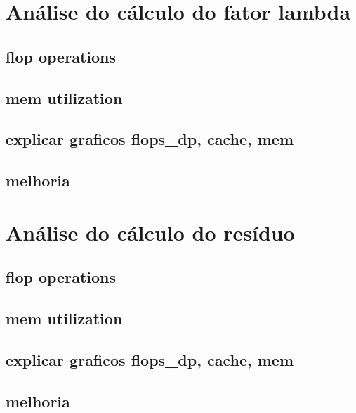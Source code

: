 \documentclass[12pt]{article}
\begin{document}
\section{Análise do cálculo do fator lambda}\label{sec:lambda}
\subsection{flop operations}
\subsection{mem utilization}
\subsection{explicar graficos flops\_dp, cache, mem}
\subsection{melhoria}

\section{Análise do cálculo do resíduo}\label{sec:residuo}
\subsection{flop operations}
\subsection{mem utilization}
\subsection{explicar graficos flops\_dp, cache, mem}
\subsection{melhoria}
\end{document}
